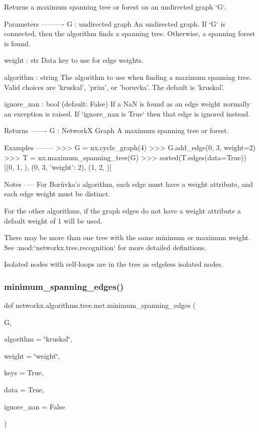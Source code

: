 \begin{DoxyVerb}Returns a maximum spanning tree or forest on an undirected graph `G`.

Parameters
----------
G : undirected graph
    An undirected graph. If `G` is connected, then the algorithm finds a
    spanning tree. Otherwise, a spanning forest is found.

weight : str
   Data key to use for edge weights.

algorithm : string
   The algorithm to use when finding a maximum spanning tree. Valid
   choices are 'kruskal', 'prim', or 'boruvka'. The default is
   'kruskal'.

ignore_nan : bool (default: False)
    If a NaN is found as an edge weight normally an exception is raised.
    If `ignore_nan is True` then that edge is ignored instead.


Returns
-------
G : NetworkX Graph
   A maximum spanning tree or forest.


Examples
--------
>>> G = nx.cycle_graph(4)
>>> G.add_edge(0, 3, weight=2)
>>> T = nx.maximum_spanning_tree(G)
>>> sorted(T.edges(data=True))
[(0, 1, {}), (0, 3, {'weight': 2}), (1, 2, {})]


Notes
-----
For Borůvka's algorithm, each edge must have a weight attribute, and
each edge weight must be distinct.

For the other algorithms, if the graph edges do not have a weight
attribute a default weight of 1 will be used.

There may be more than one tree with the same minimum or maximum weight.
See :mod:`networkx.tree.recognition` for more detailed definitions.

Isolated nodes with self-loops are in the tree as edgeless isolated nodes.\end{DoxyVerb}
 \mbox{\label{namespacenetworkx_1_1algorithms_1_1tree_1_1mst_ac8a6ab0fd620af1803b6ff0f2ade3898}} 
\subsubsection{\texorpdfstring{minimum\+\_\+spanning\+\_\+edges()}{minimum\_spanning\_edges()}}
{\footnotesize\ttfamily def networkx.\+algorithms.\+tree.\+mst.\+minimum\+\_\+spanning\+\_\+edges (\begin{DoxyParamCaption}\item[{}]{G,  }\item[{}]{algorithm = {\ttfamily \char`\"{}kruskal\char`\"{}},  }\item[{}]{weight = {\ttfamily \char`\"{}weight\char`\"{}},  }\item[{}]{keys = {\ttfamily True},  }\item[{}]{data = {\ttfamily True},  }\item[{}]{ignore\+\_\+nan = {\ttfamily False} }\end{DoxyParamCaption})}

